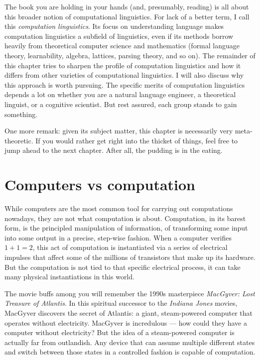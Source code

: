 The book you are holding in your hands (and, presumably, reading) is all about this broader notion of computational linguistics.
For lack of a better term, I call this \emph{computation linguistics}.
Its focus on understanding language makes computation linguistics a subfield of linguistics, even if its methods borrow heavily from theoretical computer science and mathematics (formal language theory, learnability, algebra, lattices, parsing theory, and so on).
The remainder of this chapter tries to sharpen the profile of computation linguistics and how it differs from other varieties of computational linguistics.
I will also discuss why this approach is worth pursuing.
The specific merits of computation linguistics depends a lot on whether you are a natural language engineer, a theoretical linguist, or a cognitive scientist.
But rest assured, each group stands to gain something.

One more remark: given its subject matter, this chapter is necessarily very meta-theoretic.
If you would rather get right into the thicket of things, feel free to jump ahead to the next chapter.
After all, the pudding is in the eating.


\section{Computers vs computation}
\label{sec:formal_computation}

While computers are the most common tool for carrying out computations nowadays, they are not what computation is about.
Computation, in its barest form, is the principled manipulation of information, of transforming some input into some output in a precise, step-wise fashion.
When a computer verifies $1 + 1 = 2$, this act of computation is instantiated via a series of electrical impulses that affect some of the millions of transistors that make up its hardware.
But the computation is not tied to that specific electrical process, it can take many physical instantiations in this world.

The movie buffs among you will remember the 1990s masterpiece \emph{MacGyver: Lost Treasure of Atlantis}.
In this spiritual successor to the \emph{Indiana Jones} movies, MacGyver discovers the secret of Atlantis: a giant, steam-powered computer that operates without electricity.
MacGyver is incredulous --- how could they have a computer without electricity?
But the idea of a steam-powered computer is actually far from outlandish.
Any device that can assume multiple different states and switch between those states in a controlled fashion is capable of computation.

